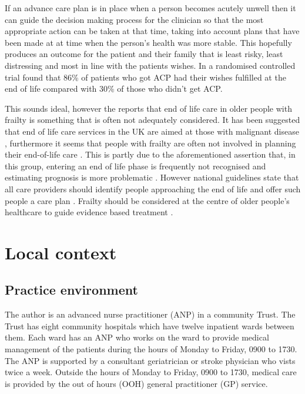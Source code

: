 \documentclass
[
	12pt,
	a4paper,
	oneside,
]{report}
\begin{document}
If an advance care plan is in place when a person becomes acutely unwell then it
can guide the decision making process for the clinician so that the most appropriate
action can be taken at that time, taking into account plans that have been made 
at at time when the person's health was more stable. This hopefully produces an
outcome for the patient and their family that is least risky, least distressing
and most in line with the patients wishes. In a randomised controlled trial
\textcite{detering:10} found that 86\% of patients who got ACP had their wishes
fulfilled at the end of life compared with 30\% of those who didn't get ACP.

This sounds ideal, however the \textcite{silver:12} reports that end of life care 
in older people with frailty
is something that is often not adequately considered. It has been suggested that 
end of life care services in the UK are aimed at those with malignant 
disease \parencite{sharp:13}, furthermore it seems that people with frailty 
are often not involved in planning their 
end-of-life care \textcite{oliver:14}. This is partly due to the aforementioned 
assertion 
that, in this group, entering an end of life phase is frequently not recognised 
\textcite{wallington:16} and
estimating prognosis is more problematic \parencite{silver:12}. However national
guidelines state that all care providers should identify people approaching 
the end of life and offer such people a care plan \parencite{dh:09}.
Frailty should be considered at the centre of older people's healthcare to guide
evidence based treatment \parencite{woo:14}.

\section{Local context}

\subsection{Practice environment}
\label{sec:local-practice}
The author is an advanced nurse practitioner (ANP) in a community Trust.
The Trust has eight community hospitals which have twelve inpatient wards between
them. Each ward has
an ANP who works on the ward to provide medical management of the patients during 
the hours of Monday to Friday, 0900 to 1730. The ANP is supported by a consultant
geriatrician or stroke physician who vists twice a week. Outside the hours of 
Monday to Friday, 0900 to 1730, medical care 
is provided by the out of hours (OOH) general practitioner (GP) service. 
\end{document}

